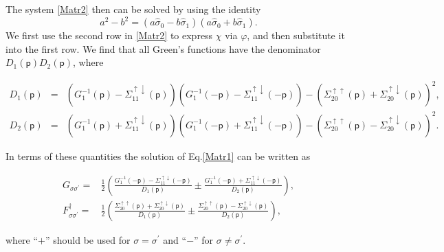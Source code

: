 \documentclass[reprint,superscriptaddress,showpacs,nofootinbib,aps,pra]{revtex4-1}
\begin{document}
The system \eqref{Matr2} then can be solved by using the identity
\begin{equation*}
a^2-b^2=(a \hat\sigma_0 - b \hat\sigma_1)(a \hat\sigma_0 + b \hat\sigma_1).
\end{equation*}
We first use the second row in \eqref{Matr2} to express $\chi$ via $\varphi$, and then substitute it into the first row. We find that all Green's functions have the denominator $D_1(\mathsf p)D_2(\mathsf p)$, where
\begin{widetext}
\begin{eqnarray}
\label{D1P}
  D_1(\mathsf p) &=& (G^{-1}_1(\mathsf p)-\Sigma^{\uparrow \downarrow}_{11}(\mathsf p))(G^{-1}_1(-\mathsf p)-\Sigma^{\uparrow \downarrow}_{11}(-\mathsf p))-(\Sigma^{\uparrow \uparrow}_{20}(\mathsf p)+ \Sigma^{\uparrow \downarrow}_{20}(\mathsf p))^2, \\ \label{D2P}
  D_2(\mathsf p) &=& (G^{-1}_1(\mathsf p)+\Sigma^{\uparrow \downarrow}_{11}(\mathsf p))(G^{-1}_1(-\mathsf p)+\Sigma^{\uparrow \downarrow}_{11}(-\mathsf p))-(\Sigma^{\uparrow \uparrow}_{20}(\mathsf p)- \Sigma^{\uparrow \downarrow}_{20}(\mathsf p))^2.
\end{eqnarray}
\end{widetext}
In terms of these quantities the solution of Eq.\eqref{Matr1} can be written as
\begin{widetext}
\begin{subequations}
\label{GF}
\begin{align}
 \label{Gud}
  G_{\sigma\sigma^\prime}= & \frac{1}{2} \left( \frac{G^{-1}_1(-\mathsf p)-\Sigma^{\uparrow \downarrow}_{11}(-\mathsf p)}{D_1(\mathsf p)} \pm \frac{G^{-1}_1(-\mathsf p)+\Sigma^{\uparrow \downarrow}_{11}(-\mathsf p)}{D_2(\mathsf p)} \right),\\ \label{Fud}
  F^\dag_{\sigma\sigma^\prime}=& \frac{1}{2} \left( \frac{\Sigma^{\uparrow \uparrow}_{20}(\mathsf p)+ \Sigma^{\uparrow \downarrow}_{20}(\mathsf p)}{D_1(\mathsf p)} \pm \frac{\Sigma^{\uparrow \uparrow}_{20}(\mathsf p)- \Sigma^{\uparrow \downarrow}_{20}(\mathsf p)}{D_2(\mathsf p)} \right),
\end{align}
\end{subequations}
\end{widetext}
where ``$+$'' should be used for $\sigma=\sigma^\prime$ and ``$-$'' for $\sigma \neq \sigma^\prime$.
\end{document}
